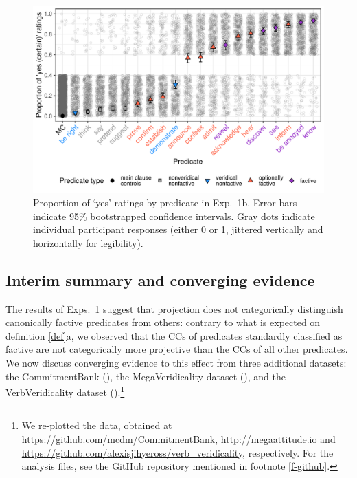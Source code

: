 \documentclass{language}
\newcommand{\6}{\mbox{$[\hspace*{-.6mm}[$}}
\newcommand{\9}{\mbox{$]\hspace*{-.6mm}]$}}
\begin{document}
\begin{figure}[H]

\centering
\includegraphics[width=.7\paperwidth]{Language-figures/color/Figure4}
\caption{Proportion of `yes' ratings by predicate in Exp.~1b. Error bars indicate 95\% bootstrapped confidence intervals. Gray dots indicate individual participant responses (either 0 or 1, jittered vertically and horizontally for legibility).}
\label{f-projectivity2}

\end{figure}

\subsection{Interim summary and converging evidence}
\label{s-converging1}

The results of Exps.~1 suggest that projection does not categorically distinguish canonically factive predicates from others: contrary to what is expected on definition \ref{def}a, we observed that the CCs of predicates standardly classified as factive are not categorically more projective than the CCs of all other predicates. We now discuss converging evidence to this effect from three additional datasets: the CommitmentBank (\citealt*{demarneffe-etal-sub23}), the MegaVeridicality dataset (\citealt{white-rawlins-nels2018,white-etal2018b}), and the VerbVeridicality dataset (\citealt{ross-pavlick2019}).\footnote{We re-plotted the data, obtained at \url{https://github.com/mcdm/CommitmentBank}, \url{http://megaattitude.io} and \url{https://github.com/alexisjihyeross/verb_veridicality}, respectively. For the analysis files, see the GitHub repository mentioned in footnote \ref{f-github}.}
\end{document}
